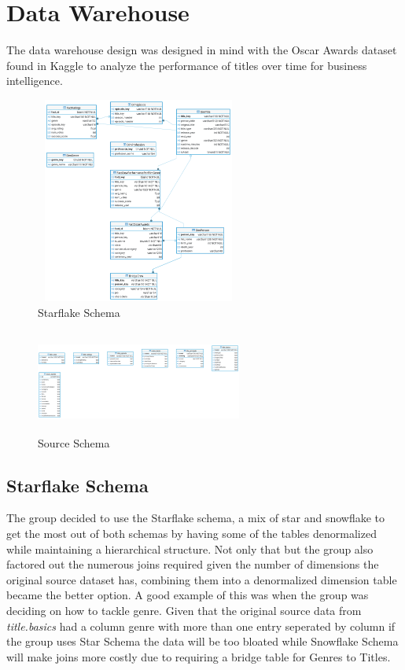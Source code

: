 \section{Data Warehouse}
The data warehouse design was designed in mind with the Oscar Awards dataset found in Kaggle to analyze the performance of titles over time for business intelligence. 
\begin{figure}
\includegraphics[height=256px, width=256px]{imdb.png}
\caption{Starflake Schema}
\end{figure}

\begin{figure}
	\includegraphics[height=128px,width=256px]{imdb_source.png}
	\caption{Source Schema}
\end{figure}
\subsection{Starflake Schema}
The group decided to use the Starflake schema, a mix of star and snowflake to get the most out of both schemas by having some of the tables denormalized while maintaining a hierarchical structure.  Not only that but the group also factored out the numerous joins required given the number of dimensions the original source dataset has, combining them into a denormalized dimension table became the better option. A good example of this was when the group was deciding on how to tackle genre. Given that the original source data from \textit{title.basics} had a column genre with more than one entry seperated by column if the group uses Star Schema the data will be too bloated while Snowflake Schema will make joins more costly due to requiring a bridge table for Genres to Titles. 
